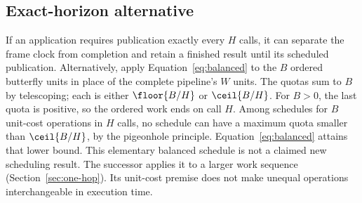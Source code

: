 \subsection{Exact-horizon alternative}
If an application requires publication exactly every $H$ calls, it can separate
the frame clock from completion and retain a finished result until its scheduled
publication. Alternatively, apply Equation~\eqref{eq:balanced} to the $B$
ordered butterfly units in place of the complete pipeline's $W$ units.
The quotas sum to $B$ by telescoping; each is either $\floor{B/H}$ or
$\ceil{B/H}$. For $B>0$, the last quota is positive, so the ordered work ends
on call $H$. Among schedules for $B$ unit-cost operations in $H$ calls, no
schedule can have a maximum quota smaller than $\ceil{B/H}$, by the pigeonhole
principle. Equation~\eqref{eq:balanced} attains that lower bound. This elementary
balanced schedule is not a claimed new scheduling result. The successor applies
it to a larger work sequence (Section~\ref{sec:one-hop}). Its unit-cost premise
does not make unequal operations interchangeable in execution time.
